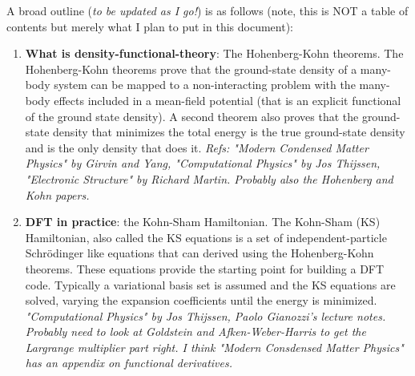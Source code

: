 \documentclass[prb,aps,11pt,superscriptaddress,floatfix]{revtex4-2}
\begin{document}
A broad outline (\emph{to be updated as I go!}) is as follows (note, this is NOT a table of contents but merely what I plan to put in this document):
\begin{enumerate}
  \item \textbf{What is density-functional-theory}: The Hohenberg-Kohn theorems. The Hohenberg-Kohn theorems prove that the ground-state density of a many-body system can be mapped to a non-interacting problem with the many-body effects included in a mean-field potential (that is an explicit functional of the ground state density). A second theorem also proves that the ground-state density that minimizes the total energy is the true ground-state density and is the only density that does it. \emph{Refs: "Modern Condensed Matter Physics" by Girvin and Yang, "Computational Physics" by Jos Thijssen, "Electronic Structure" by Richard Martin. Probably also the Hohenberg and Kohn papers.}
  \item \textbf{DFT in practice}: the Kohn-Sham Hamiltonian. The Kohn-Sham (KS) Hamiltonian, also called the KS equations is a set of independent-particle Schr\"odinger like equations that can derived using the Hohenberg-Kohn theorems. These equations provide the starting point for building a DFT code. Typically a variational basis set is assumed and the KS equations are solved, varying the expansion coefficients until the energy is minimized. \emph{"Computational Physics" by Jos Thijssen, Paolo Gianozzi's lecture notes. Probably need to look at Goldstein and Afken-Weber-Harris to get the Largrange multiplier part right. I think "Modern Consdensed Matter Physics" has an appendix on functional derivatives.}


\end{enumerate}
\end{document}
